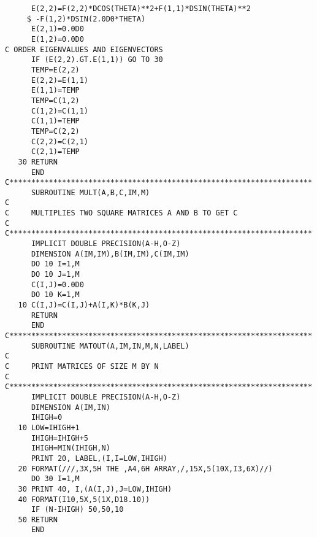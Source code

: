 \begin{verbatim}
      E(2,2)=F(2,2)*DCOS(THETA)**2+F(1,1)*DSIN(THETA)**2
     $ -F(1,2)*DSIN(2.0D0*THETA)
      E(2,1)=0.0D0
      E(1,2)=0.0D0
C ORDER EIGENVALUES AND EIGENVECTORS
      IF (E(2,2).GT.E(1,1)) GO TO 30
      TEMP=E(2,2)
      E(2,2)=E(1,1)
      E(1,1)=TEMP
      TEMP=C(1,2)
      C(1,2)=C(1,1)
      C(1,1)=TEMP
      TEMP=C(2,2)
      C(2,2)=C(2,1)
      C(2,1)=TEMP
   30 RETURN
      END
C*********************************************************************
      SUBROUTINE MULT(A,B,C,IM,M)
C
C     MULTIPLIES TWO SQUARE MATRICES A AND B TO GET C
C
C*********************************************************************
      IMPLICIT DOUBLE PRECISION(A-H,O-Z)
      DIMENSION A(IM,IM),B(IM,IM),C(IM,IM)
      DO 10 I=1,M
      DO 10 J=1,M
      C(I,J)=0.0D0
      DO 10 K=1,M
   10 C(I,J)=C(I,J)+A(I,K)*B(K,J)
      RETURN
      END
C*********************************************************************
      SUBROUTINE MATOUT(A,IM,IN,M,N,LABEL)
C
C     PRINT MATRICES OF SIZE M BY N
C
C*********************************************************************
      IMPLICIT DOUBLE PRECISION(A-H,O-Z)
      DIMENSION A(IM,IN)
      IHIGH=0
   10 LOW=IHIGH+1
      IHIGH=IHIGH+5
      IHIGH=MIN(IHIGH,N)
      PRINT 20, LABEL,(I,I=LOW,IHIGH)
   20 FORMAT(///,3X,5H THE ,A4,6H ARRAY,/,15X,5(10X,I3,6X)//)
      DO 30 I=1,M
   30 PRINT 40, I,(A(I,J),J=LOW,IHIGH)
   40 FORMAT(I10,5X,5(1X,D18.10))
      IF (N-IHIGH) 50,50,10
   50 RETURN
      END
         
\end{verbatim}


